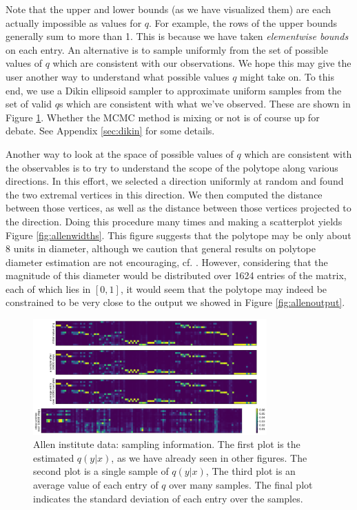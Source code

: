 Note that the upper and lower bounds (as we have visualized them) are each actually impossible as values for $q$.  For example, the rows of the upper bounds generally sum to more than 1.  This is because we have taken \emph{elementwise bounds} on each entry.  An alternative is to  sample uniformly from the set of possible values of $q$ which are consistent with our observations.  We hope this may give the user another way to understand what possible values $q$ might take on.  To this end, we use a Dikin ellipsoid sampler to approximate uniform samples from the set of valid $q$s which are consistent with what we've observed.  These are shown in Figure \ref{fig:allenavg}.  Whether the MCMC method is mixing or not is of course up for debate.  See Appendix \ref{sec:dikin} for some details.

Another way to look at the space of possible values of $q$ which are consistent with the observables is to try to understand the scope of the polytope along various directions.  In this effort, we selected a direction uniformly at random and found the two extremal vertices in this direction.  We then computed the distance between those vertices, as well as the distance between those vertices projected to the direction.  Doing this procedure many times and making a scatterplot yields Figure \ref{fig:allenwidths}.  This figure suggests that the polytope may be only about 8 units in diameter, although we caution that general results on polytope diameter estimation are not encouraging, cf. \citep{brieden1998approximation}.  However, considering that the magnitude of this diameter would be distributed over 1624 entries of the matrix, each of which lies in $[0,1]$, it would seem that the polytope may indeed be constrained to be very close to the output we showed in Figure \ref{fig:allenoutput}.

\begin{figure}
\includegraphics[width=0.8\textwidth]{pics/allenavg}
\caption{Allen institute data: sampling information.  The first plot is the estimated $q(y|x)$, as we have already seen in other figures.  The second plot is a single sample of $q(y|x)$,  The third plot is an average value of each entry of $q$ over many samples.  The final plot indicates the standard deviation of each entry over the samples. \label{fig:allenavg}}
\end{figure}

